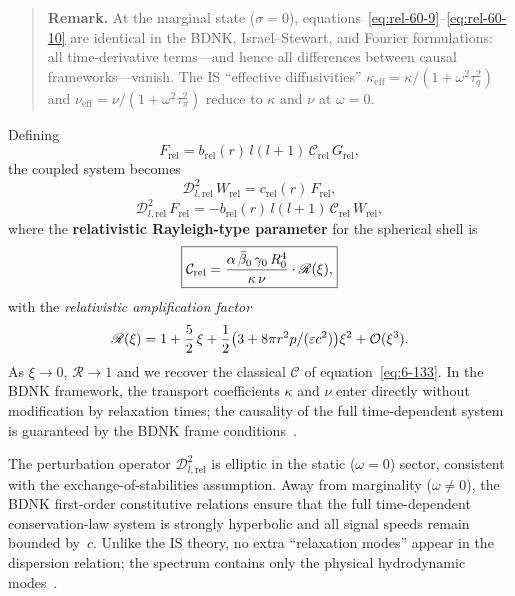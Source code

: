 \begin{quote}
\textbf{Remark.}  At the marginal state ($\sigma = 0$),
equations~\eqref{eq:rel-60-9}--\eqref{eq:rel-60-10} are identical
in the BDNK, Israel--Stewart, and Fourier formulations: all
time-derivative terms---and hence all differences between causal
frameworks---vanish.  The IS ``effective diffusivities''
$\kappa_{\mathrm{eff}} = \kappa/(1 + \omega^{2}\tau_{q}^{2})$ and
$\nu_{\mathrm{eff}} = \nu/(1 + \omega^{2}\tau_{\pi}^{2})$ reduce
to $\kappa$ and $\nu$ at $\omega = 0$.
\end{quote}

Defining
\begin{equation}\label{eq:rel-60-12}
F_{\mathrm{rel}} = b_{\mathrm{rel}}(r)\,l(l+1)\,\mathcal{C}_{\mathrm{rel}}\,G_{\mathrm{rel}},
\end{equation}
the coupled system becomes
\begin{equation}\label{eq:rel-60-13}
\mathscr{D}_{l,\mathrm{rel}}^{2}\,W_{\mathrm{rel}}
  = c_{\mathrm{rel}}(r)\,F_{\mathrm{rel}},
\end{equation}
\begin{equation}\label{eq:rel-60-14}
\mathscr{D}_{l,\mathrm{rel}}^{2}\,F_{\mathrm{rel}}
  = -b_{\mathrm{rel}}(r)\,l(l+1)\,\mathcal{C}_{\mathrm{rel}}\,W_{\mathrm{rel}},
\end{equation}
where the \textbf{relativistic Rayleigh-type parameter} for the
spherical shell is
\begin{equation}\label{eq:rel-60-15}
\boxed{%
\mathcal{C}_{\mathrm{rel}}
  = \frac{\alpha\,\bar{\beta}_{0}\,\gamma_{0}\,R_{0}^{4}}
         {\kappa\,\nu}
  \cdot\mathscr{R}(\xi),
}
\end{equation}
with the \emph{relativistic amplification factor}
\begin{equation}\label{eq:rel-60-16}
\mathscr{R}(\xi) = 1 + \frac{5}{2}\,\xi
  + \frac{1}{2}\bigl(3 + 8\pi r^{2}p/(\varepsilon c^{2})\bigr)\xi^{2}
  + \mathcal{O}(\xi^{3}).
\end{equation}
As $\xi\to 0$, $\mathscr{R}\to 1$ and we recover the classical
$\mathcal{C}$ of equation~\eqref{eq:6-133}.  In the BDNK framework,
the transport coefficients $\kappa$ and $\nu$ enter directly without
modification by relaxation times; the causality of the full
time-dependent system is guaranteed by the BDNK frame
conditions~\cite{BemficaDN2018,Kovtun2019,BemficaDNK2023}.

\begin{causalitycheck}
The perturbation operator $\mathscr{D}_{l,\mathrm{rel}}^{2}$ is
elliptic in the static ($\omega=0$) sector, consistent with the
exchange-of-stabilities assumption.  Away from marginality
($\omega\neq 0$), the BDNK first-order constitutive relations ensure
that the full time-dependent conservation-law system is strongly
hyperbolic and all signal speeds remain bounded by~$c$.  Unlike
the IS theory, no extra ``relaxation modes'' appear in the
dispersion relation; the spectrum contains only the physical
hydrodynamic modes~\cite{Kovtun2019,HoultKovtun2020}.
\end{causalitycheck}

